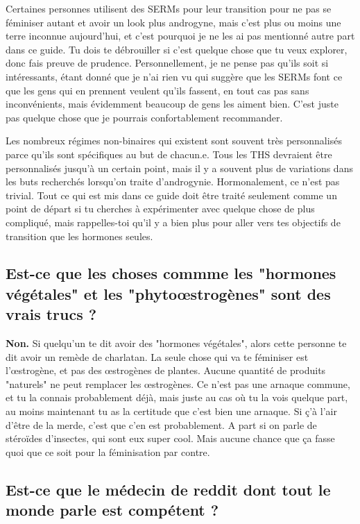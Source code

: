 \documentclass{article}
\begin{document}
Certaines personnes utilisent des SERMs pour leur transition pour ne pas se féminiser autant et avoir un look plus androgyne, mais c'est plus ou moins une terre inconnue aujourd'hui, et c'est pourquoi je ne les ai pas mentionné autre part dans ce guide. Tu dois te débrouiller si c'est quelque chose que tu veux explorer, donc fais preuve de prudence. Personnellement, je ne pense pas qu'ils soit si intéressants, étant donné que je n'ai rien vu qui suggère que les SERMs font ce que les gens qui en prennent veulent qu'ils fassent, en tout cas pas sans inconvénients, mais évidemment beaucoup de gens les aiment bien. C'est juste pas quelque chose que je pourrais confortablement recommander.

Les nombreux régimes non-binaires qui existent sont souvent très personnalisés parce qu'ils sont spécifiques au but de chacun.e. Tous les THS devraient être personnalisés jusqu'à un certain point, mais il y a souvent plus de variations dans les buts recherchés lorsqu'on traite d'androgynie. Hormonalement, ce n'est pas trivial. Tout ce qui est mis dans ce guide doit être traité seulement comme un point de départ si tu cherches à expérimenter avec quelque chose de plus compliqué, mais rappelles-toi qu'il y a bien plus pour aller vers tes objectifs de transition que les hormones seules.

\subsection{Est-ce que les choses commme les "hormones végétales" et les "phytoœstrogènes" sont des vrais trucs ?}

\textbf{Non.} Si quelqu'un te dit avoir des "hormones végétales", alors cette personne te dit avoir un remède de charlatan. La seule chose qui va te féminiser est l'œstrogène, et pas des œstrogènes de plantes. Aucune quantité de produits "naturels" ne peut remplacer les œstrogènes. Ce n'est pas une arnaque commune, et tu la connais probablement déjà, mais juste au cas où tu la vois quelque part, au moins maintenant tu as la certitude que c'est bien une arnaque. Si ç'à l'air d'être de la merde, c'est que c'en est probablement. A part si on parle de stéroïdes d'insectes, qui sont eux super cool. Mais aucune chance que ça fasse quoi que ce soit pour la féminisation par contre.

\subsection{Est-ce que le médecin de reddit dont tout le monde parle est compétent ?}
\end{document}
